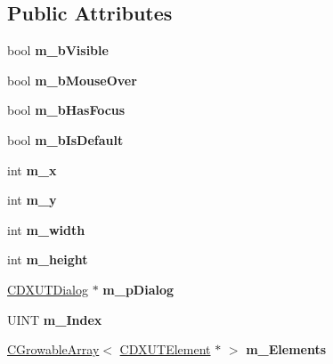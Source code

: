 \subsection*{Public Attributes}
\begin{DoxyCompactItemize}
\item 
\hypertarget{class_c_d_x_u_t_control_a9673eef8fa31de9e182f9a48d8b8cd16}{bool {\bfseries m\+\_\+b\+Visible}}\label{class_c_d_x_u_t_control_a9673eef8fa31de9e182f9a48d8b8cd16}

\item 
\hypertarget{class_c_d_x_u_t_control_ab1f57181edbeedf121922db6cdc7d3ad}{bool {\bfseries m\+\_\+b\+Mouse\+Over}}\label{class_c_d_x_u_t_control_ab1f57181edbeedf121922db6cdc7d3ad}

\item 
\hypertarget{class_c_d_x_u_t_control_a635408030201d3daf9fff7d5cb1c0076}{bool {\bfseries m\+\_\+b\+Has\+Focus}}\label{class_c_d_x_u_t_control_a635408030201d3daf9fff7d5cb1c0076}

\item 
\hypertarget{class_c_d_x_u_t_control_ad7553797639f844d3ad77f324d62043f}{bool {\bfseries m\+\_\+b\+Is\+Default}}\label{class_c_d_x_u_t_control_ad7553797639f844d3ad77f324d62043f}

\item 
\hypertarget{class_c_d_x_u_t_control_a7ff012a10429df693525a53638b5b71a}{int {\bfseries m\+\_\+x}}\label{class_c_d_x_u_t_control_a7ff012a10429df693525a53638b5b71a}

\item 
\hypertarget{class_c_d_x_u_t_control_a88a4c4b4337437eec5071bb36c789f07}{int {\bfseries m\+\_\+y}}\label{class_c_d_x_u_t_control_a88a4c4b4337437eec5071bb36c789f07}

\item 
\hypertarget{class_c_d_x_u_t_control_a273b313694fbe608f1e892402eb26357}{int {\bfseries m\+\_\+width}}\label{class_c_d_x_u_t_control_a273b313694fbe608f1e892402eb26357}

\item 
\hypertarget{class_c_d_x_u_t_control_a6b29c74ead25395f0a2870c74b6bd336}{int {\bfseries m\+\_\+height}}\label{class_c_d_x_u_t_control_a6b29c74ead25395f0a2870c74b6bd336}

\item 
\hypertarget{class_c_d_x_u_t_control_a2fdb56085c0e1b96cc27281e5480eb2e}{\hyperlink{class_c_d_x_u_t_dialog}{C\+D\+X\+U\+T\+Dialog} $\ast$ {\bfseries m\+\_\+p\+Dialog}}\label{class_c_d_x_u_t_control_a2fdb56085c0e1b96cc27281e5480eb2e}

\item 
\hypertarget{class_c_d_x_u_t_control_a800474d07b3db99c726b586b5d4b945a}{U\+I\+N\+T {\bfseries m\+\_\+\+Index}}\label{class_c_d_x_u_t_control_a800474d07b3db99c726b586b5d4b945a}

\item 
\hypertarget{class_c_d_x_u_t_control_a79025a7c59a2d967ccf2782c3d67c131}{\hyperlink{class_c_growable_array}{C\+Growable\+Array}$<$ \hyperlink{class_c_d_x_u_t_element}{C\+D\+X\+U\+T\+Element} $\ast$ $>$ {\bfseries m\+\_\+\+Elements}}\label{class_c_d_x_u_t_control_a79025a7c59a2d967ccf2782c3d67c131}

\end{DoxyCompactItemize}
